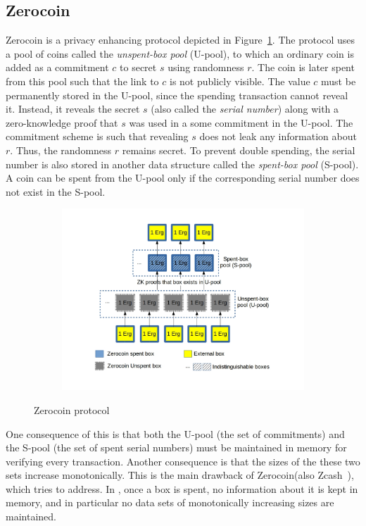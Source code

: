 \documentclass[runningheads]{llncs}
\newcommand{\zerocoin}{Zerocoin\xspace}
\begin{document}
\subsection{\zerocoin}
\label{zerocoin} 

\zerocoin is a privacy enhancing protocol depicted in Figure~\ref{fig:zerocoin}. The protocol uses a pool of coins called the {\em unspent-box pool} (U-pool), to which an ordinary coin is added as a commitment $c$ to secret $s$ using randomness $r$. The coin is later spent from this pool such that the link to $c$ is not publicly visible. The value $c$ must be permanently stored in the U-pool, since the spending transaction cannot reveal it. Instead, it reveals the secret $s$ (also called the {\em serial number}) along with a zero-knowledge proof that $s$ was used in a some commitment in the U-pool. The commitment scheme is such that revealing $s$ does not leak any information about $r$. Thus, the randomness $r$ remains secret. To prevent double spending, the serial number is also stored in another data structure called the {\em spent-box pool} (S-pool). A coin can be spent from the U-pool only if the corresponding serial number does not exist in the S-pool. 

\begin{figure}[h]
	\centering
	\begin{subfigure}{.7\textwidth}
		\centering
		\includegraphics[width=\linewidth]{Zerocoin.jpg}
	\end{subfigure}
	\caption{\zerocoin protocol}
	\label{fig:zerocoin}
\end{figure}

One consequence of this is that both the U-pool (the set of commitments) and the S-pool (the set of spent serial numbers) must be maintained in memory for verifying every transaction. 
Another consequence is that the sizes of the these two sets increase monotonically. 
This is the main drawback of \zerocoin (also Zcash~\cite{zcash}), which \algname tries to address. 
In \algname, once a box is spent, no information about it is kept in memory, and in particular no data sets of monotonically increasing sizes are maintained. 
\end{document}
